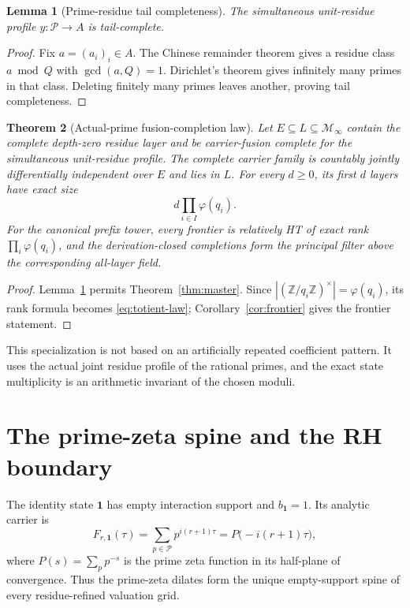 \documentclass[11pt]{article}
\newtheorem{theorem}{Theorem}[section]
\newtheorem{lemma}[theorem]{Lemma}
\theoremstyle{definition}
\theoremstyle{remark}
\newcommand{\cM}{\mathcal M}
\newcommand{\cP}{\mathcal P}
\begin{document}
\begin{lemma}[Prime-residue tail completeness]\label{lem:prime-tail}
The simultaneous unit-residue profile \(y:\cP\to A\) is tail-complete.
\end{lemma}

\begin{proof}
Fix \(a=(a_i)_i\in A\).  The Chinese remainder theorem gives a residue class
\(a\bmod Q\) with \(\gcd(a,Q)=1\).  Dirichlet's theorem gives infinitely many primes in that
class.  Deleting finitely many primes leaves another, proving tail completeness.
\end{proof}

\begin{theorem}[Actual-prime fusion-completion law]\label{thm:actual-prime}
Let \(E\subseteq L\subseteq\cM_\infty\) contain the complete depth-zero residue layer and be
carrier-fusion complete for the simultaneous unit-residue profile.  The complete carrier family
is countably jointly differentially independent over \(E\) and lies in \(L\).  For every
\(d\geq0\), its first \(d\) layers have exact size
\begin{equation}\label{eq:totient-law}
 d\prod_{i\in I}\varphi(q_i).
\end{equation}
For the canonical prefix tower, every frontier is relatively HT of exact rank
\(\prod_i\varphi(q_i)\), and the derivation-closed completions form the principal filter above
the corresponding all-layer field.
\end{theorem}

\begin{proof}
Lemma~\ref{lem:prime-tail} permits Theorem~\ref{thm:master}.  Since
\(|(\mathbb Z/q_i\mathbb Z)^\times|=\varphi(q_i)\), its rank formula becomes
\eqref{eq:totient-law}; Corollary~\ref{cor:frontier} gives the frontier statement.
\end{proof}

This specialization is not based on an artificially repeated coefficient pattern.  It uses the
actual joint residue profile of the rational primes, and the exact state multiplicity is an
arithmetic invariant of the chosen moduli.

\section{The prime-zeta spine and the RH boundary}\label{sec:zeta}

The identity state \(\mathbf1\) has empty interaction support and
\(b_{\mathbf1}=1\).  Its analytic carrier is
\begin{equation}\label{eq:prime-zeta-spine}
 F_{r,\mathbf1}(\tau)=\sum_{p\in\cP}p^{i(r+1)\tau}
 =P\bigl(-i(r+1)\tau\bigr),
\end{equation}
where \(P(s)=\sum_pp^{-s}\) is the prime zeta function in its half-plane of convergence.
Thus the prime-zeta dilates form the unique empty-support spine of every residue-refined
valuation grid.
\end{document}
